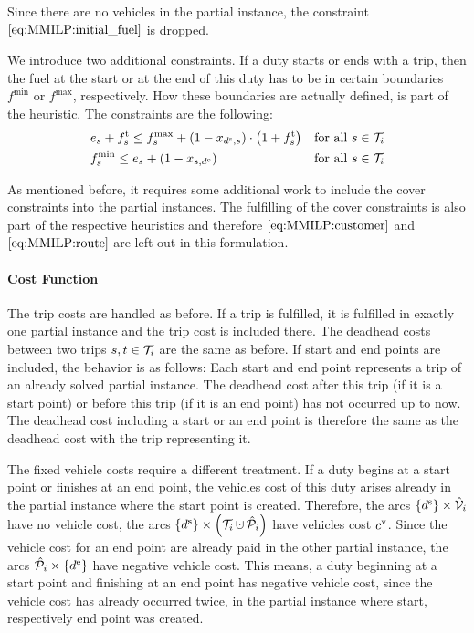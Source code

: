 Since there are no vehicles in the partial instance, the constraint $\eqref{eq:MMILP:initial_fuel}$ is dropped.

We introduce two additional constraints. If a duty starts or ends with a trip, then the fuel at the start or at the end of this duty has to be in certain boundaries $f^{\min}$ or $f^{\max}$, respectively. How these boundaries are actually defined, is part of the heuristic. The constraints are the following:
\begin{align}
	& e_s + f^{\operatorname{t}}_s \leq f^{\max}_s + \left(1-x_{d^{\operatorname{s}},s}\right)\cdot\left(1+f^{\operatorname{t}}_s\right) && \text{for all } s\in\mathcal{T}_i \label{eq:CMILP:fmax} \\
	& f^{\min}_s \leq e_s + \left(1-x_{s,d^{\operatorname{e}}}\right) && \text{for all } s\in\mathcal{T}_i \label{eq:CMILP:fmin}
\end{align}

As mentioned before, it requires some additional work to include the cover constraints into the partial instances. The fulfilling of the cover constraints is also part of the respective heuristics and therefore $\eqref{eq:MMILP:customer}$ and $\eqref{eq:MMILP:route}$ are left out in this formulation.

\paragraph{Cost Function} \parfill

The trip costs are handled as before. If a trip is fulfilled, it is fulfilled in exactly one partial instance and the trip cost is included there. The deadhead costs between two trips $s,t\in\mathcal{T}_i$ are the same as before. If start and end points are included, the behavior is as follows: Each start and end point represents a trip of an already solved partial instance. The deadhead cost after this trip (if it is a start point) or before this trip (if it is an end point) has not occurred up to now. The deadhead cost including a start or an end point is therefore the same as the deadhead cost with the trip representing it.

The fixed vehicle costs require a different treatment. If a duty begins at a start point or finishes at an end point, the vehicles cost of this duty arises already in the partial instance where the start point is created. Therefore, the arcs ${\left\{d^{\operatorname{s}}\right\}\times\hat{\mathcal{V}}_i}$ have no vehicle cost, the arcs ${\left\{\ds\right\}\times\left(\Ti\cupdot\Phat_i\right)}$ have vehicles cost $c^{\operatorname{v}}$. Since the vehicle cost for an end point are already paid in the other partial instance, the arcs ${\hat{\mathcal{P}}_i\times\left\{d^{\operatorname{e}}\right\}}$ have negative vehicle cost. This means, a duty beginning at a start point and finishing at an end point has negative vehicle cost, since the vehicle cost has already occurred twice, in the partial instance where start, respectively end point was created.


